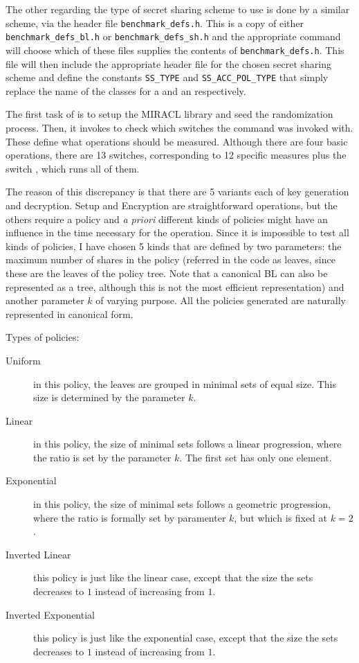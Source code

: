 \documentclass{article}
\begin{document}
The other regarding the type of secret sharing scheme to use is done by a similar scheme, via the header file \verb|benchmark_defs.h|. This is a copy of either \verb|benchmark_defs_bl.h| or \verb|benchmark_defs_sh.h| and the appropriate \fmake command will choose which of these files supplies the contents of \verb|benchmark_defs.h|. This file will then include the appropriate header file for the chosen secret sharing scheme and define the constants \verb|SS_TYPE| and \verb|SS_ACC_POL_TYPE| that simply replace the name of the classes for a \cSS and an \cAP respectively.

The first task of  is to setup the MIRACL library and seed the randomization process. Then, it invokes  to check which switches the command was invoked with. These define what operations should be measured. Although there are four basic operations, there are 13 switches, corresponding to 12 specific measures plus the switch , which runs all of them.

The reason of this discrepancy is that there are 5 variants each of key generation and decryption. Setup and Encryption are straightforward operations, but the others require a policy and \emph{a priori} different kinds of policies might have an influence in the time necessary for the operation. Since it is impossible to test all kinds of policies, I have chosen 5 kinds that are defined by two parameters: the maximum number of shares in the policy (referred in the code as leaves, since these are the leaves of the policy tree. Note that a canonical BL can also be represented as a tree, although this is not the most efficient representation) and another parameter $k$ of varying purpose. All the policies generated are naturally represented in canonical form. 

Types of policies:
\begin{description}
\item[Uniform] in this policy, the leaves are grouped in minimal sets of equal size. This size is determined by the parameter $k$. 
\item[Linear] in this policy, the size of minimal sets follows a linear progression, where the ratio is set by the parameter $k$. The first set has only one element.
\item[Exponential] in this policy, the size of minimal sets follows a geometric progression, where the ratio is formally set by paramenter $k$, but which is fixed at $k=2$. 
\item[Inverted Linear] this policy is just like the linear case, except that the size the sets decreases to $1$ instead of increasing from $1$.
\item[Inverted Exponential] this policy is just like the exponential case, except that the size the sets decreases to $1$ instead of increasing from $1$.
\end{description}
\end{document}
